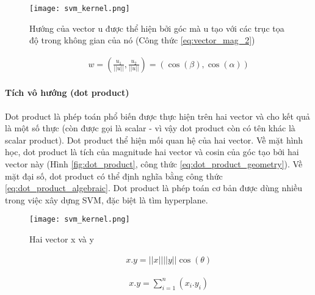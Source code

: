 \begin{figure}[h!]
	\centering
	\captionsetup{width=0.8\textwidth}
	\texttt{[image: svm\_kernel.png]}
	\caption{Hướng của vector u được thể hiện bởi góc mà u tạo với các trục tọa độ trong không gian của nó (Công thức \ref{eq:vector_mag_2})}
    \label{fig:vector_dir}
\end{figure}

\begin{eqnarray}
\label{eq:vector_mag_2}
\hspace{1cm} w = (\frac{u_1}{||u||}, \frac{u_2}{||u||}) = (\cos({\beta}), \cos({\alpha}))
\end{eqnarray}

\paragraph*{Tích vô hướng (dot product)}
Dot product là phép toán phổ biến được thực hiện trên hai vector và cho kết quả là một số thực (còn được gọi là scalar - vì vậy dot product còn có tên khác là scalar product). Dot product thể hiện mối quan hệ của hai vector. Về mặt hình học, dot product là tích của magnitude hai vector và cosin của góc tạo bởi hai vector này (Hình \ref{fig:dot_product}, công thức \ref{eq:dot_product_geometry}). Về mặt đại số, dot product có thể định nghĩa bằng công thức \ref{eq:dot_product_algebraic}. Dot product là phép toán cơ bản được dùng nhiều trong việc xây dựng SVM, đặc biệt là tìm hyperplane.
\begin{figure}[h!]
	\centering
	\captionsetup{width=0.8\textwidth}
	\texttt{[image: svm\_kernel.png]}
	\caption{Hai vector x và y}
    \label{fig:vector_dir}
\end{figure}

\begin{eqnarray}
\label{eq:dot_product_geometry}
\hspace{1cm} x.y = ||x||||y||\cos({\theta})
\end{eqnarray}

\begin{eqnarray}
\label{eq:dot_product_algebraic}
\hspace{1cm} x.y = \sum_{i=1}^{n} (x_i.y_i)
\end{eqnarray}

